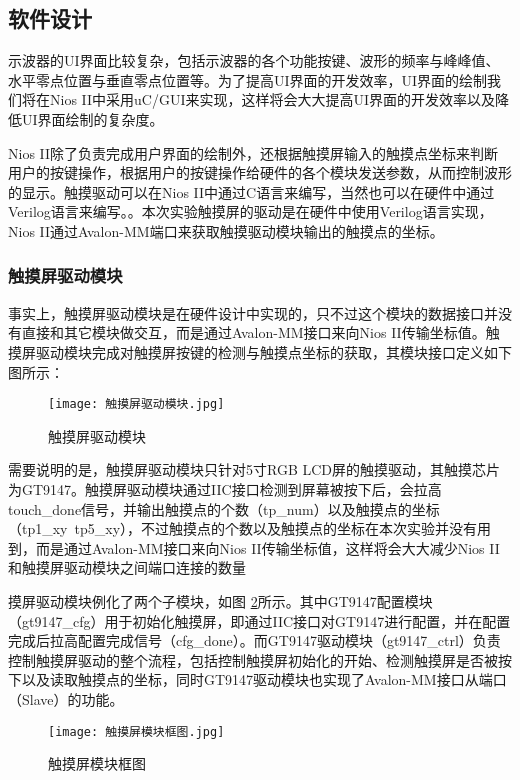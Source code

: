 \documentclass[lang=cn,a4paper,newtx]{elegantpaper}
\begin{document}
\subsection{软件设计}
	示波器的UI界面比较复杂，包括示波器的各个功能按键、波形的频率与峰峰值、水平零点位置与垂直零点位置等。为了提高UI界面的开发效率，UI界面的绘制我们将在Nios II中采用uC/GUI来实现，这样将会大大提高UI界面的开发效率以及降低UI界面绘制的复杂度。
	
	Nios II除了负责完成用户界面的绘制外，还根据触摸屏输入的触摸点坐标来判断用户的按键操作，根据用户的按键操作给硬件的各个模块发送参数，从而控制波形的显示。触摸驱动可以在Nios II中通过C语言来编写，当然也可以在硬件中通过Verilog语言来编写。。本次实验触摸屏的驱动是在硬件中使用Verilog语言实现，Nios II通过Avalon-MM端口来获取触摸驱动模块输出的触摸点的坐标。
	
\subsubsection{触摸屏驱动模块}
事实上，触摸屏驱动模块是在硬件设计中实现的，只不过这个模块的数据接口并没有直接和其它模块做交互，而是通过Avalon-MM接口来向Nios II传输坐标值。触摸屏驱动模块完成对触摸屏按键的检测与触摸点坐标的获取，其模块接口定义如下图所示：
  \begin{figure}[!htb]
	\centering
	\caption{触摸屏驱动模块}
	\label{触摸屏驱动模块}
	\texttt{[image: 触摸屏驱动模块.jpg]}
\end{figure}
需要说明的是，触摸屏驱动模块只针对5寸RGB LCD屏的触摸驱动，其触摸芯片为GT9147。触摸屏驱动模块通过IIC接口检测到屏幕被按下后，会拉高touch\_done信号，并输出触摸点的个数（tp\_num）以及触摸点的坐标（tp1\_xy~tp5\_xy），不过触摸点的个数以及触摸点的坐标在本次实验并没有用到，而是通过Avalon-MM接口来向Nios II传输坐标值，这样将会大大减少Nios II和触摸屏驱动模块之间端口连接的数量

摸屏驱动模块例化了两个子模块，如图 \ref{触摸屏模块框图}所示。其中GT9147配置模块（gt9147\_cfg）用于初始化触摸屏，即通过IIC接口对GT9147进行配置，并在配置完成后拉高配置完成信号（cfg\_done）。而GT9147驱动模块（gt9147\_ctrl）负责控制触摸屏驱动的整个流程，包括控制触摸屏初始化的开始、检测触摸屏是否被按下以及读取触摸点的坐标，同时GT9147驱动模块也实现了Avalon-MM接口从端口（Slave）的功能。

  \begin{figure}[!htb]
	\centering
	\caption{触摸屏模块框图}
	\label{触摸屏模块框图}
	\texttt{[image: 触摸屏模块框图.jpg]}
\end{figure}
\end{document}
